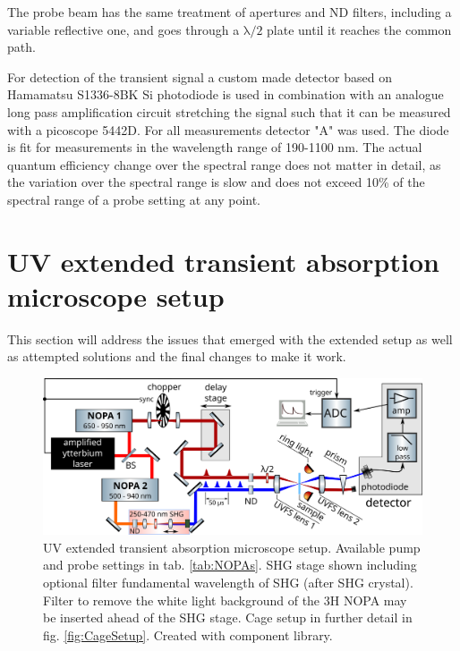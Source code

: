 \documentclass[twoside,openright,listof=numbered]{scrreprt}
\begin{document}
The probe beam has the same treatment of apertures and ND filters, including a variable reflective one, and goes through a $\mathrm{\lambda/2}$ plate until it reaches the common path.


For detection of the transient signal a custom made detector based on Hamamatsu S1336-8BK Si photodiode is used in combination with an analogue long pass amplification circuit stretching the signal such that it can be measured with a picoscope 5442D. For all measurements detector "A" was used. The diode is fit for measurements in the wavelength range of 190-1100 nm. The actual quantum efficiency change over the spectral range does not matter in detail, as the variation over the spectral range is slow and does not exceed 10\% of the spectral range of a probe setting at any point.

\section{UV extended transient absorption microscope setup}
This section will address the issues that emerged with the extended setup as well as attempted solutions and the final changes to make it work.

\begin{figure}[h]
\centering
\includegraphics[width=0.9\linewidth]{images/ComponentLibrary_svg/experimental_tam_shg_swapped.png}
\caption[UV extended transient absorption microscope setup.]{UV extended transient absorption microscope setup. Available pump and probe settings in tab. \ref{tab:NOPAs}.
SHG stage shown including optional filter fundamental wavelength of SHG (after SHG crystal). Filter to remove the white light background of the 3H NOPA may be inserted ahead of the SHG stage. Cage setup in further detail in fig. \ref{fig:CageSetup}. Created with component library.}
\end{figure}
\end{document}
